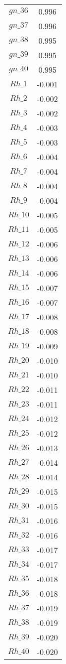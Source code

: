 \begin{center}
\begin{longtable}{cc}
$gn\_36$ 	 & 	 0.996 \\
$gn\_37$ 	 & 	 0.996 \\
$gn\_38$ 	 & 	 0.995 \\
$gn\_39$ 	 & 	 0.995 \\
$gn\_40$ 	 & 	 0.995 \\
$Rh\_1$ 	 & 	 -0.001 \\
$Rh\_2$ 	 & 	 -0.002 \\
$Rh\_3$ 	 & 	 -0.002 \\
$Rh\_4$ 	 & 	 -0.003 \\
$Rh\_5$ 	 & 	 -0.003 \\
$Rh\_6$ 	 & 	 -0.004 \\
$Rh\_7$ 	 & 	 -0.004 \\
$Rh\_8$ 	 & 	 -0.004 \\
$Rh\_9$ 	 & 	 -0.004 \\
$Rh\_10$ 	 & 	 -0.005 \\
$Rh\_11$ 	 & 	 -0.005 \\
$Rh\_12$ 	 & 	 -0.006 \\
$Rh\_13$ 	 & 	 -0.006 \\
$Rh\_14$ 	 & 	 -0.006 \\
$Rh\_15$ 	 & 	 -0.007 \\
$Rh\_16$ 	 & 	 -0.007 \\
$Rh\_17$ 	 & 	 -0.008 \\
$Rh\_18$ 	 & 	 -0.008 \\
$Rh\_19$ 	 & 	 -0.009 \\
$Rh\_20$ 	 & 	 -0.010 \\
$Rh\_21$ 	 & 	 -0.010 \\
$Rh\_22$ 	 & 	 -0.011 \\
$Rh\_23$ 	 & 	 -0.011 \\
$Rh\_24$ 	 & 	 -0.012 \\
$Rh\_25$ 	 & 	 -0.012 \\
$Rh\_26$ 	 & 	 -0.013 \\
$Rh\_27$ 	 & 	 -0.014 \\
$Rh\_28$ 	 & 	 -0.014 \\
$Rh\_29$ 	 & 	 -0.015 \\
$Rh\_30$ 	 & 	 -0.015 \\
$Rh\_31$ 	 & 	 -0.016 \\
$Rh\_32$ 	 & 	 -0.016 \\
$Rh\_33$ 	 & 	 -0.017 \\
$Rh\_34$ 	 & 	 -0.017 \\
$Rh\_35$ 	 & 	 -0.018 \\
$Rh\_36$ 	 & 	 -0.018 \\
$Rh\_37$ 	 & 	 -0.019 \\
$Rh\_38$ 	 & 	 -0.019 \\
$Rh\_39$ 	 & 	 -0.020 \\
$Rh\_40$ 	 & 	 -0.020 \\
\bottomrule%
\end{longtable}
\end{center}
